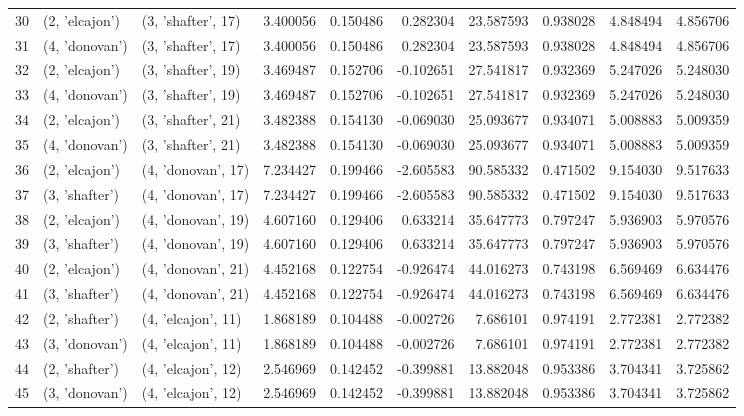 \begin{tabular}{lllrrrrrrr}
30 &   (2, 'elcajon') &  (3, 'shafter', 17) &  3.400056 &  0.150486 &  0.282304 &  23.587593 &  0.938028 &  4.848494 &  4.856706 \\
31 &   (4, 'donovan') &  (3, 'shafter', 17) &  3.400056 &  0.150486 &  0.282304 &  23.587593 &  0.938028 &  4.848494 &  4.856706 \\
32 &   (2, 'elcajon') &  (3, 'shafter', 19) &  3.469487 &  0.152706 & -0.102651 &  27.541817 &  0.932369 &  5.247026 &  5.248030 \\
33 &   (4, 'donovan') &  (3, 'shafter', 19) &  3.469487 &  0.152706 & -0.102651 &  27.541817 &  0.932369 &  5.247026 &  5.248030 \\
34 &   (2, 'elcajon') &  (3, 'shafter', 21) &  3.482388 &  0.154130 & -0.069030 &  25.093677 &  0.934071 &  5.008883 &  5.009359 \\
35 &   (4, 'donovan') &  (3, 'shafter', 21) &  3.482388 &  0.154130 & -0.069030 &  25.093677 &  0.934071 &  5.008883 &  5.009359 \\
36 &   (2, 'elcajon') &  (4, 'donovan', 17) &  7.234427 &  0.199466 & -2.605583 &  90.585332 &  0.471502 &  9.154030 &  9.517633 \\
37 &   (3, 'shafter') &  (4, 'donovan', 17) &  7.234427 &  0.199466 & -2.605583 &  90.585332 &  0.471502 &  9.154030 &  9.517633 \\
38 &   (2, 'elcajon') &  (4, 'donovan', 19) &  4.607160 &  0.129406 &  0.633214 &  35.647773 &  0.797247 &  5.936903 &  5.970576 \\
39 &   (3, 'shafter') &  (4, 'donovan', 19) &  4.607160 &  0.129406 &  0.633214 &  35.647773 &  0.797247 &  5.936903 &  5.970576 \\
40 &   (2, 'elcajon') &  (4, 'donovan', 21) &  4.452168 &  0.122754 & -0.926474 &  44.016273 &  0.743198 &  6.569469 &  6.634476 \\
41 &   (3, 'shafter') &  (4, 'donovan', 21) &  4.452168 &  0.122754 & -0.926474 &  44.016273 &  0.743198 &  6.569469 &  6.634476 \\
42 &   (2, 'shafter') &  (4, 'elcajon', 11) &  1.868189 &  0.104488 & -0.002726 &   7.686101 &  0.974191 &  2.772381 &  2.772382 \\
43 &   (3, 'donovan') &  (4, 'elcajon', 11) &  1.868189 &  0.104488 & -0.002726 &   7.686101 &  0.974191 &  2.772381 &  2.772382 \\
44 &   (2, 'shafter') &  (4, 'elcajon', 12) &  2.546969 &  0.142452 & -0.399881 &  13.882048 &  0.953386 &  3.704341 &  3.725862 \\
45 &   (3, 'donovan') &  (4, 'elcajon', 12) &  2.546969 &  0.142452 & -0.399881 &  13.882048 &  0.953386 &  3.704341 &  3.725862 \\

\end{tabular}
